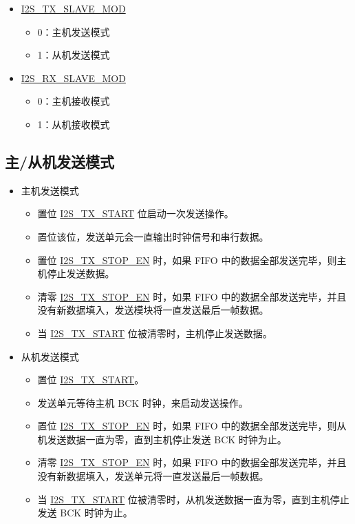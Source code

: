 \documentclass[main\_\_CN.tex]{subfiles}
\begin{document}
\begin{itemize}
    \item \hyperref[fielddesc:I2STXSLAVEMOD]{I2S\_TX\_SLAVE\_MOD}
    \begin{itemize}
        \item 0：主机发送模式
        \item 1：从机发送模式
    \end{itemize}
    \item \hyperref[fielddesc:I2SRXSLAVEMOD]{I2S\_RX\_SLAVE\_MOD}
    \begin{itemize}
        \item 0：主机接收模式
        \item 1：从机接收模式
    \end{itemize}
\end{itemize}

\subsection{主/从机发送模式} \label{subsubsection:master/slave_transmitting_mode}
\begin{itemize}
    \item 主机发送模式
    \begin{itemize}
        \item 置位 \hyperref[fielddesc:I2STXSTART]{I2S\_TX\_START} 位启动一次发送操作。
        \item 置位该位，发送单元会一直输出时钟信号和串行数据。
        \item 置位 \hyperref[fielddesc:I2STXSTOPEN]{I2S\_TX\_STOP\_EN} 时，如果 FIFO 中的数据全部发送完毕，则主机停止发送数据。
        \item 清零 \hyperref[fielddesc:I2STXSTOPEN]{I2S\_TX\_STOP\_EN} 时，如果 FIFO 中的数据全部发送完毕，并且没有新数据填入，发送模块将一直发送最后一帧数据。
        \item 当 \hyperref[fielddesc:I2STXSTART]{I2S\_TX\_START} 位被清零时，主机停止发送数据。
    \end{itemize}
    \item 从机发送模式
     \begin{itemize}
        \item 置位 \hyperref[fielddesc:I2STXSTART]{I2S\_TX\_START}。
        \item 发送单元等待主机 BCK 时钟，来启动发送操作。
        \item 置位 \hyperref[fielddesc:I2STXSTOPEN]{I2S\_TX\_STOP\_EN} 时，如果 FIFO 中的数据全部发送完毕，则从机发送数据一直为零，直到主机停止发送 BCK 时钟为止。
        \item 清零 \hyperref[fielddesc:I2STXSTOPEN]{I2S\_TX\_STOP\_EN} 时，如果 FIFO 中的数据全部发送完毕，并且没有新数据填入，发送单元将一直发送最后一帧数据。
        \item 当 \hyperref[fielddesc:I2STXSTART]{I2S\_TX\_START} 位被清零时，从机发送数据一直为零，直到主机停止发送 BCK 时钟为止。
    \end{itemize}
\end{itemize}
\end{document}
